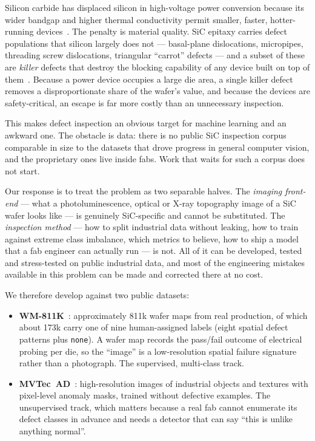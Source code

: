 \documentclass[11pt,a4paper]{article}
\begin{document}
Silicon carbide has displaced silicon in high-voltage power conversion because
its wider bandgap and higher thermal conductivity permit smaller, faster,
hotter-running devices~\citep{kimoto2014sic,kimoto2015material}. The penalty is
material quality. SiC epitaxy carries defect populations that silicon largely
does not --- basal-plane dislocations, micropipes, threading screw
dislocations, triangular ``carrot'' defects --- and a subset of these are
\emph{killer} defects that destroy the blocking capability of any device built
on top of them~\citep{kimoto2015material}. Because a power device occupies a
large die area, a single killer defect removes a disproportionate share of the
wafer's value, and because the devices are safety-critical, an escape is far
more costly than an unnecessary inspection.

This makes defect inspection an obvious target for machine learning and an
awkward one. The obstacle is data: there is no public SiC inspection corpus
comparable in size to the datasets that drove progress in general computer
vision, and the proprietary ones live inside fabs. Work that waits for such a
corpus does not start.

Our response is to treat the problem as two separable halves. The
\emph{imaging front-end} --- what a photoluminescence, optical or X-ray
topography image of a SiC wafer looks like --- is genuinely SiC-specific and
cannot be substituted. The \emph{inspection method} --- how to split
industrial data without leaking, how to train against extreme class imbalance,
which metrics to believe, how to ship a model that a fab engineer can actually
run --- is not. All of it can be developed, tested and stress-tested on public
industrial data, and most of the engineering mistakes available in this problem
can be made and corrected there at no cost.

We therefore develop against two public datasets:

\begin{itemize}
  \item \textbf{WM-811K}~\citep{wu2015wafer}: approximately 811k wafer maps
    from real production, of which about 173k carry one of nine
    human-assigned labels (eight spatial defect patterns plus \texttt{none}).
    A wafer map records the pass/fail outcome of electrical probing per die,
    so the ``image'' is a low-resolution spatial failure signature rather than
    a photograph. The supervised, multi-class track.
  \item \textbf{MVTec~AD}~\citep{bergmann2019mvtec}: high-resolution images of
    industrial objects and textures with pixel-level anomaly masks, trained
    without defective examples. The unsupervised track, which matters because
    a real fab cannot enumerate its defect classes in advance and needs a
    detector that can say ``this is unlike anything normal''.
\end{itemize}
\end{document}
